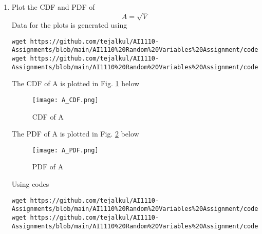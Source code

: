 \documentclass[journal,12pt,twocolumn]{IEEEtran}
\renewcommand\thesection{\arabic{section}}
\begin{document}
\begin{enumerate}[label=\thesection.\arabic*
,ref=\thesection.\theenumi]
\begin{equation}
F_{R}(R) = 
\begin{cases}
1 - e^{\frac{-R^2}{2}} & x \geq 0 \\
0 & x < 0,
\end{cases}
\end{equation}
Now, 
\begin{align}
  F_{V}\brak{x} &= P\brak{V \leq x} \\
                &= P\brak{R^2 \leq x} \\
                &= P\brak{R \leq \sqrt{x}} \\
                &= F_{R}\brak{\sqrt{x}} 
\end{align}
Hence,
\begin{equation}
F_{V}(x) = 
\begin{cases}
1 - e^{\frac{-x}{2}} & x \geq 0 \\
0 & x < 0,
\end{cases}
\end{equation}
\begin{equation}
    \implies \alpha = \frac{1}{2}
\end{equation}



\item
\label{ch3_raleigh_sim}
Plot the CDF and PDF of
%
\begin{equation}
A = \sqrt{V}
\end{equation}
%
\solution
Data for the plots is generated using
\begin{lstlisting}
wget https://github.com/tejalkul/AI1110-Assignments/blob/main/AI1110%20Random%20Variables%20Assignment/codes/exrand.c
wget https://github.com/tejalkul/AI1110-Assignments/blob/main/AI1110%20Random%20Variables%20Assignment/codes/coeffs.h
\end{lstlisting}
The CDF of A is plotted in Fig. \ref{Fig:root_V_cdf} below 
\begin{figure}[!ht]
\texttt{[image: A\_CDF.png]}
\caption{CDF of A}
\label{Fig:root_V_cdf}
\end{figure}

The PDF of A is plotted in Fig. \ref{Fig:root_V_pdf} below 
\begin{figure}[!ht]
\texttt{[image: A\_PDF.png]}
\caption{PDF of A}
\label{Fig:root_V_pdf}
\end{figure} 

Using codes
\begin{lstlisting}
wget https://github.com/tejalkul/AI1110-Assignments/blob/main/AI1110%20Random%20Variables%20Assignment/codes/cdf_plot.py
wget https://github.com/tejalkul/AI1110-Assignments/blob/main/AI1110%20Random%20Variables%20Assignment/codes/pdf_plot.py
\end{lstlisting}
\end{enumerate}
\end{document}
